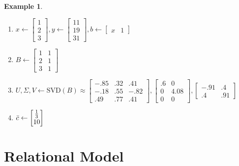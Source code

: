 \documentclass{article}%
\newtheorem{example}[theorem]{Example}
\begin{document}
\begin{example}
\ 

\begin{enumerate}
\item $x\leftarrow
\begin{bmatrix}
1\\
2\\
3
\end{bmatrix}, y\leftarrow \begin{bmatrix}
   11\\19\\31 
\end{bmatrix}, b \leftarrow \begin{bmatrix}
    x & 1
\end{bmatrix}$

\item $B \leftarrow \begin{bmatrix}
    1 & 1\\
    2 & 1\\
    3 & 1
\end{bmatrix}$

\item $U, \Sigma, V \leftarrow \text{SVD}(B) \approx \begin{bmatrix}
    -.85 & .32 & .41 \\
    -.18 & .55 & -.82 \\
    .49 & .77 & .41
\end{bmatrix}, \begin{bmatrix}
    .6 & 0 \\
    0 & 4.08 \\
    0 & 0
\end{bmatrix}, \begin{bmatrix}
    -.91 & .4 \\
    .4 & .91
\end{bmatrix}$
\item $\Bar{c} \leftarrow \begin{bmatrix}
    \frac{1}{3} \\ 10
\end{bmatrix}$
\end{enumerate}
\end{example}
\pagebreak
\part{Relational Model}

\end{document}
